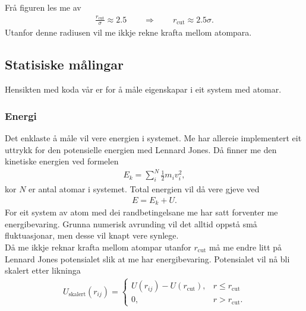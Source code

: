 \documentclass[12pt, a4paper]{article}
\theoremstyle{definition} \newtheorem*{definition}{Teorem}
\begin{document}
            Frå figuren les me av 
            \begin{align*}
                \frac{r_{\text{cut}}}{\sigma} \approx 2.5 \qquad \Rightarrow \qquad r_{\text{cut}} \approx 2.5\sigma.
            \end{align*}
            Utanfor denne radiusen vil me ikkje rekne krafta mellom atompara.


    \newpage

    \subsection*{Statisiske målingar}
        Hensikten med koda vår er for å måle eigenskapar i eit system med atomar.

        \subsubsection*{Energi}
            Det enklaste å måle vil vere energien i systemet. Me har allereie implementert eit uttrykk for den potensielle energien med Lennard Jones. Då finner me
            den kinetiske energien ved formelen
            \begin{align*}
                E_{k} = \sum_{i}^N\frac{1}{2}m_iv_{i}^2,
            \end{align*}
            kor $N$ er antal atomar i systemet. Total energien vil då vere gjeve ved
            \begin{align*}
                E = E_{k} + U.
            \end{align*}
            For eit system av atom med dei randbetingelsane me har satt forventer me energibevaring. Grunna numerisk avrunding vil det alltid oppstå små fluktuasjonar,
            men desse vil knapt vere synlege. \\

            Då me ikkje reknar krafta mellom atompar utanfor $r_{\text{cut}}$ må me endre litt på Lennard Jones potensialet slik at me har energibevaring. 
            Potensialet vil nå bli skalert etter likninga
            \begin{align*}
                U_{\text{skalert}}(r_{ij}) = 
                \begin{cases}
                    U(r_{ij}) - U(r_{\text{cut}}), & r \leq r_{\text{cut}} \\
                    0, & r > r_{\text{cut}}.
                \end{cases}
            \end{align*}
\end{document}
